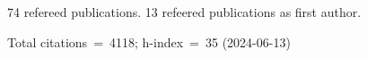 74 refereed publications. 13 refeered publications as first author.

Total citations~=~4118; h-index~=~35 (2024-06-13)